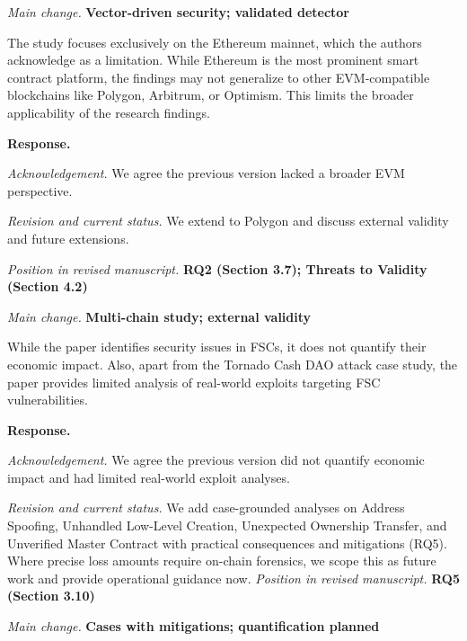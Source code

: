 \documentclass[acmsmall]{acmart}
\begin{document}
	\textit{Main change.} {\color{blue}\textbf{Vector-driven security; validated detector}}

	\begin{tcolorbox}
		[commentbox,title=Reviewer \#3 -- Comment 5] The study focuses exclusively on the Ethereum mainnet,
		which the authors acknowledge as a limitation. While Ethereum is the most prominent smart contract
		platform, the findings may not generalize to other EVM-compatible blockchains like Polygon, Arbitrum,
		or Optimism. This limits the broader applicability of the research findings.
	\end{tcolorbox}

	\noindent
	\textbf{Response.}

	\textit{Acknowledgement.} We agree the previous version lacked a broader EVM perspective.

	\textit{Revision and current status.} We extend to Polygon and discuss external validity and
	future extensions.

	\textit{Position in revised manuscript.} {\color{red}\textbf{RQ2 (Section 3.7); Threats to Validity (Section 4.2)}}

	\textit{Main change.} {\color{blue}\textbf{Multi-chain study; external validity}}

	\begin{tcolorbox}
		[commentbox,title=Reviewer \#3 -- Comment 6] While the paper identifies security issues in FSCs,
		it does not quantify their economic impact. Also, apart from the Tornado Cash DAO attack
		case study, the paper provides limited analysis of real-world exploits targeting FSC vulnerabilities.
	\end{tcolorbox}

	\noindent
	\textbf{Response.}

	\textit{Acknowledgement.} We agree the previous version did not quantify economic impact and had
	limited real-world exploit analyses.

	\textit{Revision and current status.} We add case-grounded analyses on Address Spoofing,
	Unhandled Low-Level Creation, Unexpected Ownership Transfer, and Unverified Master Contract with
	practical consequences and mitigations (RQ5). Where precise loss amounts require on-chain forensics,
	we scope this as future work and provide operational guidance now. \textit{Position in revised
	manuscript.} {\color{red}\textbf{RQ5 (Section 3.10)}}

	\textit{Main change.} {\color{blue}\textbf{Cases with mitigations; quantification planned}}
\end{document}
